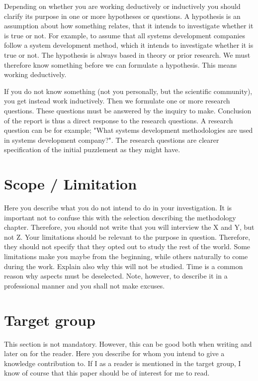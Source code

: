 Depending on whether you are working deductively or inductively you should clarify its purpose in one or more hypotheses or questions. A hypothesis is an assumption about how something relates, that it intends to investigate whether it is true or not. For example, to assume that all systems development companies follow a system development method, which it intends to investigate whether it is true or not. The hypothesis is always based in theory or prior research. We must therefore know something before we can formulate a hypothesis. This means working deductively.

If you do not know something (not you personally, but the scientific community), you get instead work inductively. Then we formulate one or more research questions. These questions must be answered by the inquiry to make. Conclusion of the report is thus a direct response to the research questions. A research question can be for example; "What systems development methodologies are used in systems development company?". The research questions are clearer specification of the initial puzzlement as they might have.

\section{Scope / Limitation}
Here you describe what you do not intend to do in your investigation. It is important not to confuse this with the selection describing the methodology chapter. Therefore, you should not write that you will interview the X and Y, but not Z. Your limitations should be relevant to the purpose in question. Therefore, they should not specify that they opted out to study the rest of the world. Some limitations make you maybe from the beginning, while others naturally to come during the work. Explain also why this will not be studied. Time is a common reason why aspects must be deselected. Note, however, to describe it in a professional manner and you shall not make excuses.

\section{Target group}
This section is not mandatory. However, this can be good both when writing and later on for the reader. Here you describe for whom you intend to give a knowledge contribution to. If I as a reader is mentioned in the target group, I know of course that this paper should be of interest for me to read.

